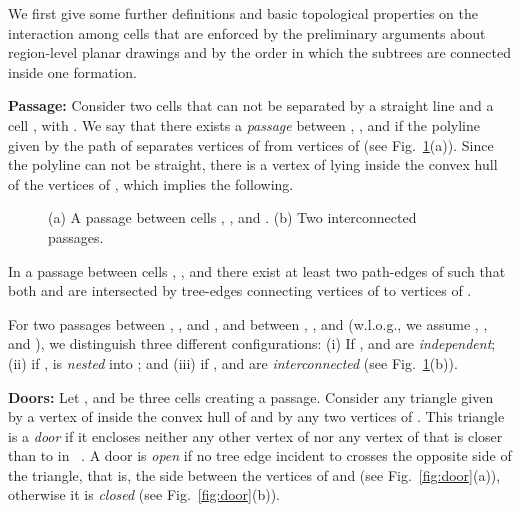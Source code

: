 \documentclass[a4paper,10pt]{llncs}
\newcounter{prop}
\newcommand{\T}{\mbox{ }}
\begin{document}
We first give some further definitions and basic topological properties on the interaction among cells that are enforced by the preliminary arguments about region-level planar drawings and by the order in which the subtrees are connected inside one formation.

{\bf Passage:} Consider two cells  that can not be separated by a straight line and a cell , with . We say that there exists a {\it passage}  between , , and  if the polyline given by the path of  separates vertices of  from vertices of  (see Fig.~\ref{fig:passage}(a)). Since the polyline can not be straight, there is a vertex of  lying inside the convex hull of the vertices of , which implies the following.

\begin{figure}[tb]
\caption{(a) A passage between cells , , and . (b) Two interconnected passages.}\label{fig:passage}
\end{figure}

\begin{property}\label{prop:passage_2_edges}
In a passage between cells , , and  there exist at least two path-edges  of  such that both  and  are intersected by tree-edges connecting vertices of  to vertices of .
\end{property}

For two passages  between , , and , and  between  , , and  (w.l.o.g., we assume , , and ), we distinguish three different configurations: (i) If ,  and  are {\it independent}; (ii) if ,  is {\it nested} into ; and (iii) if ,  and  are {\it interconnected} (see Fig.~\ref{fig:passage}(b)).

{\bf Doors:}
Let , and  be three cells creating a passage. Consider any triangle given by a vertex  of  inside the convex hull of  and by any two vertices of .
This triangle is a \emph{door} if it encloses neither any other vertex of  nor any vertex of  that is closer than  to  in \T. A door is \emph{open} if no tree edge incident to  crosses the opposite side of the triangle, that is, the side between the vertices of  and  (see Fig.~\ref{fig:door}(a)), otherwise it is \emph{closed} (see Fig.~\ref{fig:door}(b)).
\end{document}
